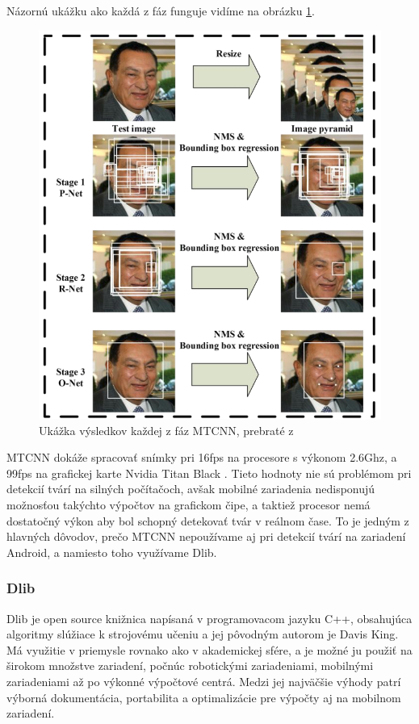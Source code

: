 \indent Názornú ukážku ako každá z fáz funguje vidíme na obrázku \ref{fig:mtcnn}.

\begin{figure}[H]
	\centering
	\includegraphics[width=0.6\linewidth]{img/mtcnn}
	\caption{Ukážka výsledkov každej z fáz MTCNN, prebraté z \cite[s.~2]{mtcnn}}
	\label{fig:mtcnn}
\end{figure}

\indent MTCNN dokáže spracovať snímky pri 16fps na procesore s výkonom 2.6Ghz, a 99fps na grafickej karte Nvidia Titan Black \cite{mtcnn}.
Tieto hodnoty nie sú problémom pri detekcií tvárí na silných počítačoch, avšak mobilné zariadenia nedisponujú možnosťou takýchto výpočtov na grafickom čipe, a taktiež procesor nemá dostatočný výkon aby bol schopný detekovať tvár v reálnom čase.
To je jedným z hlavných dôvodov, prečo MTCNN nepoužívame aj pri detekcií tvárí na zariadení Android, a namiesto toho využívame Dlib.

\subsubsection{Dlib}
Dlib je open source knižnica napísaná v programovacom jazyku C++, obsahujúca algoritmy slúžiace k strojovému učeniu a jej pôvodným autorom je Davis King\cite{dlibCLib91}.
Má využitie v priemysle rovnako ako v akademickej sfére, a je možné ju použiť na širokom množstve zariadení, počnúc robotickými zariadeniami, mobilnými zariadeniami až po výkonné výpočtové centrá.
Medzi jej najväčšie výhody patrí výborná dokumentácia, portabilita a optimalizácie pre výpočty aj na mobilnom zariadení. \\

